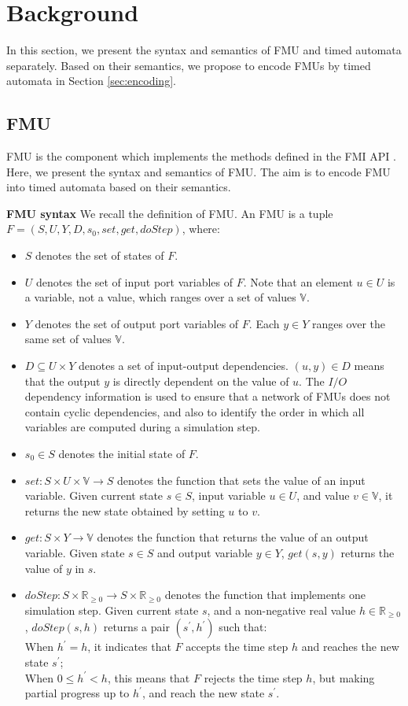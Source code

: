 \section{Background}
\label{sec:fmi}
In this section, we present the syntax and semantics of FMU and timed automata separately. Based on their semantics, we propose to encode FMUs by timed automata in Section \ref{sec:encoding}. 

\subsection{FMU}
FMU is the component which implements the methods defined in the FMI API \cite{Tripakis15}. Here, we present the syntax and semantics of FMU. The aim is to encode FMU into timed automata based on their semantics.
\begin{definition}
\textbf{FMU syntax}
We recall the definition of FMU. An FMU is a tuple $F=(S,U,Y,D,s_{0},set,get,doStep)$, where:
\end{definition}
\begin{itemize}
\item
$S$ denotes the set of states of $F$. 
\item
$U$ denotes the set of input port variables of $F$. Note that an element $u \in U$ is a variable, not a value, which ranges over a set of values $\mathbb{V}$. 
\item
$Y$ denotes the set of output port variables of $F$. Each $y \in Y$ ranges over the same set of values $\mathbb{V}$.
\item
$D \subseteq U \times Y$ denotes a set of input-output dependencies. $(u,y) \in D $ means that the output $y$ is directly dependent on the value of $u$. The $I/O$ dependency information is used to ensure that a network of FMUs does not contain cyclic dependencies, and also to identify the order in which all variables are computed during a simulation step.
\item
$s_{0} \in S$ denotes the initial state of $F$.
\item
$set : S \times U \times \mathbb{V} \rightarrow S$ denotes the function that sets the value of an input variable. Given current state $s \in S$, input variable $u \in U$, and value $v \in \mathbb{V}$, it returns the new state obtained by setting $u$ to $v$.
\item
$get : S \times Y \rightarrow \mathbb{V}$ denotes the function that returns the value of an output variable. Given state $s \in S$ and output variable $y \in Y$, $get(s,y)$ returns the value of $y$ in $s$.
\item
$doStep : S \times \mathbb{R}_{\geqslant{0}} \rightarrow S \times \mathbb{R}_{\geqslant{0}}$ denotes the function that implements one simulation step. Given current state $s$, and a non-negative real value $h \in \mathbb{R}_{\geqslant{0}}$, $doStep(s,h)$ returns a pair $(s^{\prime},h^{\prime})$ such that:
\\
When $h^{\prime} = h$, it indicates that $F$ accepts the time step $h$ and reaches the new state $s^{\prime}$;
\\
When $0 \leqslant h^{\prime} < h$, this means that $F$ rejects the time step $h$, but making partial progress up to $h^{\prime}$, and reach the new state $s^{\prime}$.
\end{itemize}

